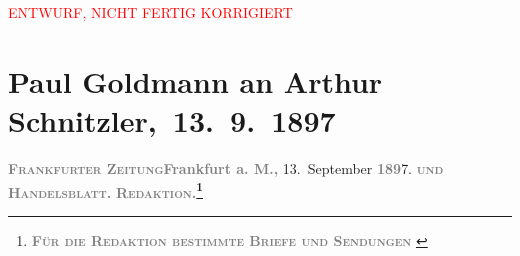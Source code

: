 
\begin{center}
            \textcolor{red}{ENTWURF, NICHT FERTIG KORRIGIERT}
                      \end{center}
            
         
         \renewcommand{\erwaehntePersonen}{Personen:  ?? [Totgeborener Sohn von Arthur Schnitzler und Marie Reinhard], Richard Beer-Hofmann, Mirjam Beer-Hofmann, Paula Beer-Hofmann, Rosa Freudenthal, Hermann Freudenthal, Marie Reinhard, Josef Rosengart}
         \renewcommand{\erwaehnteInstitutionen}{Institutionen: Frankfurter Zeitung, Houghton Library}
         \renewcommand{\erwaehnteOrte}{Orte: Frankfurt am Main, Paris, Rossertstraße, Wien}
         \renewcommand{\erwaehnteWerke}{}
               \section[ Paul Goldmann an Arthur Schnitzler, 13. 9. 1897]{ Paul Goldmann an Arthur Schnitzler, 13. 9. 1897}\nopagebreak{}\rehead{ }\begin{ledgroupsized}[t]{13cm}\normalsize\beginnumbering \toendnotes[C]{\smallbreak\pagebreak[2]} 
\toendnotes[C]{\smallbreak}\pstart
           \noindent{}{\pb}\textcolor{gray}{\textbf{\textsc{Frankfurter Zeitung}}}\hfill \textcolor{gray}{\textbf{Frankfurt a. M.,}}{ }13. September \textcolor{gray}{\textbf{189}}7.\pend
           \pstart
           \textsc{\textcolor{gray}{\textbf{und}}}\pend
           \pstart
           \textcolor{gray}{\textbf{\textsc{Handelsblatt.}}}\pend
           \pstart
           \textcolor{gray}{\textbf{\textsc{Redaktion.\footnote{\noindent{}\textcolor{gray}{\textbf{\textsc{Für die Redaktion beſtimmte Briefe und Sendungen
}}}}}}}
\end{ledgroupsized}
